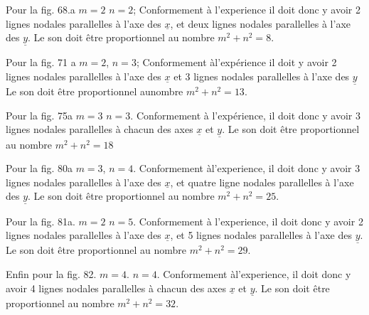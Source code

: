 \documentclass[11pt,a4paper]{article}
\begin{document}
Pour la fig. 68.a $m=2$ $n=2$; Conformement à l'experience
il doit donc y avoir 2 lignes nodales parallelles à l'axe
des $\underline{x}$, et deux lignes nodales parallelles à l'axe des $\underline{y}$.
Le son doit être proportionnel au nombre $m^2+n^2=8$.

Pour la fig. 71 a $m=2$, $n=3$; Conformement àl'expérience
il doit y avoir 2 lignes nodales parallelles à l'axe des $\underline{x}$
et 3 lignes nodales parallelles à l'axe des $\underline{y}$
Le son doit être proportionnel aunombre $m^2+n^2=13$.

Pour la fig. 75a $m=3$ $n=3$. Conformement à l'expérience,
il doit donc y avoir 3 lignes nodales parallelles à chacun
des axes $\underline{x}$ et $\underline{y}$.
Le son doit être proportionnel au nombre $m^2+n^2=18$


Pour la fig. 80a $m=3$, $n=4$. Conformement àl'experience, il doit donc y avoir
3 lignes nodales parallelles à l'axe des $\underline{x}$, et quatre ligne nodales parallelles
à l'axe des $\underline{y}$.
Le son doit être proportionnel au nombre $m^2+n^2=25$.

Pour la fig. 81a. $m=2$ $n=5$. Conformement à l'experience, il doit donc
y avoir 2 lignes nodales parallelles à l'axe des $\underline{x}$, et 5 lignes nodales
parallelles à l'axe des $\underline{y}$.
Le son doit être proportionnel au nombre $m^2+n^2=29$.

Enfin pour la fig. 82. $m=4$. $n=4$. Conformement àl'experience, il doit
donc y avoir 4 lignes nodales parallelles à chacun des axes $\underline{x}$ et $\underline{y}$.
Le son doit être proportionnel au nombre $m^2+n^2=32$.
\end{document}
